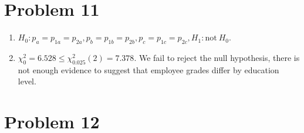 \documentclass{article}
\begin{document}
\section*{Problem 11}

\begin{enumerate}
	\item $H_0: p_a = p_{1a} = p_{2a}, p_b = p_{1b} = p_{2b}, p_c = p_{1c} = p_{2c}, H_1: \textrm{not}~ H_0$.
	\item $\chi_0^2 = 6.528 \le \chi_{0.025}^2(2) = 7.378$.
		We fail to reject the null hypothesis, there is not enough
		evidence to suggest that employee grades differ by education
		level.
\end{enumerate}

\section*{Problem 12}
\end{document}
